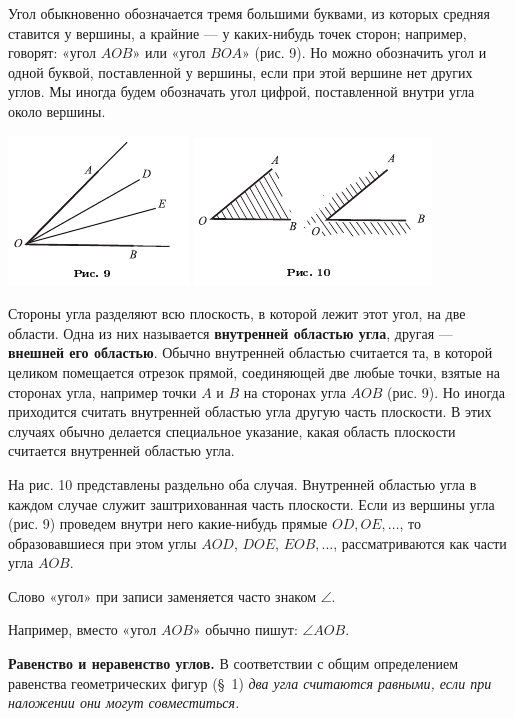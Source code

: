 \documentclass[oneside]{book}
\begin{document}
Угол обыкновенно обозначается тремя большими буквами, из которых средняя ставится у вершины, а крайние — у каких-нибудь точек сторон;
например, говорят:
«угол $AOB$» или «угол $BOA$» (рис. 9).
Но можно обозначить угол и одной буквой, поставленной у вершины, если при этой вершине нет других углов.
Мы иногда будем обозначать угол цифрой, поставленной внутри угла около вершины.

\includegraphics{pics/ris-9}
\includegraphics{pics/ris-10}

Стороны угла разделяют всю плоскость, в которой лежит этот угол, на две области.
Одна из них называется \textbf{внутренней областью угла}, другая — \textbf{внешней его областью}.
Обычно внутренней областью считается та, в которой целиком помещается отрезок прямой, соединяющей две любые точки, взятые на сторонах угла, например точки $A$ и $B$ на сторонах угла $AOB$ (рис. 9).
Но иногда приходится считать внутренней областью угла другую часть плоскости.
В этих случаях обычно делается специальное указание, какая область плоскости считается внутренней областью угла.

На рис. 10 представлены раздельно оба случая.
Внутренней областью угла в каждом случае служит заштрихованная часть плоскости.
Если из вершины угла (рис. 9) проведем внутри него какие-нибудь прямые $OD, OE,\dots$, то образовавшиеся при этом углы $AOD$, $DOE$, $EOB,\dots$, рассматриваются как части угла $AOB$.

Слово «угол» при записи заменяется часто знаком $\angle$.

Например, вместо «угол $AOB$» обычно пишут:
$\angle AOB$.

\textbf{Равенство и неравенство углов.}
В соответствии с общим определением равенства геометрических фигур (§~1) \emph{два угла считаются равными, если при наложении они могут совместиться.}
\end{document}
